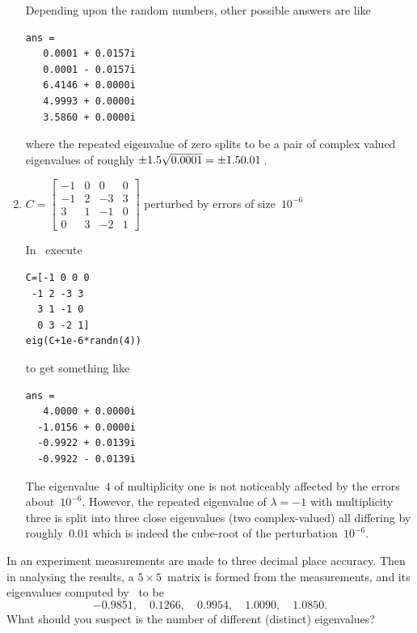 \begin{example}
\begin{enumerate}
\begin{solution}
Depending upon the random numbers, other possible answers are like
\begin{verbatim}
ans =
   0.0001 + 0.0157i
   0.0001 - 0.0157i
   6.4146 + 0.0000i
   4.9993 + 0.0000i
   3.5860 + 0.0000i
\end{verbatim}
where the repeated eigenvalue of zero splits to be a pair of complex valued eigenvalues of roughly \(\pm 1.5\sqrt{0.0001}=\pm 1.50.01\)\,.
\end{solution}



\item \(C=\begin{bmatrix}-1&0&0&0
\\-1&2&-3&3
\\3&1&-1&0
\\0&3&-2&1\end{bmatrix}\) perturbed by errors of size~\(10^{-6}\)
\begin{solution} 
In \script\ execute
\begin{verbatim}
C=[-1 0 0 0
 -1 2 -3 3
  3 1 -1 0
  0 3 -2 1]
eig(C+1e-6*randn(4))
\end{verbatim}
\setbox\ajrqrbox\hbox{}%
\marginajrbox%
to get something like
\begin{verbatim}
ans =
   4.0000 + 0.0000i
  -1.0156 + 0.0000i
  -0.9922 + 0.0139i
  -0.9922 - 0.0139i
\end{verbatim}
The eigenvalue~\(4\) of multiplicity one is not noticeably affected by the errors about~\(10^{-6}\).
However, the repeated eigenvalue of \(\lambda=-1\) with multiplicity three is split into three close eigenvalues (two complex-valued) all differing by roughly~\(0.01\) which is indeed the cube-root of the perturbation~\(10^{-6}\).
\end{solution}

\end{enumerate}
\end{example}






\begin{activity}
In an experiment measurements are made to three decimal place accuracy.
Then in analysing the results, a \(5\times5\)~matrix is formed from the measurements, and its eigenvalues computed by \script\ to be
\begin{equation*}
-0.9851,\quad
0.1266,\quad
0.9954,\quad
1.0090,\quad
1.0850.
\end{equation*}
What should you suspect is the number of different (distinct) eigenvalues?
\end{activity}








